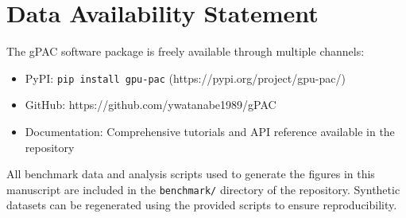 \section*{Data Availability Statement}
The gPAC software package is freely available through multiple channels:
\begin{itemize}
\item PyPI: \texttt{pip install gpu-pac} (https://pypi.org/project/gpu-pac/)
\item GitHub: https://github.com/ywatanabe1989/gPAC
\item Documentation: Comprehensive tutorials and API reference available in the repository
\end{itemize}

All benchmark data and analysis scripts used to generate the figures in this manuscript are included in the \texttt{benchmark/} directory of the repository. Synthetic datasets can be regenerated using the provided scripts to ensure reproducibility.

\label{data and code availability}
